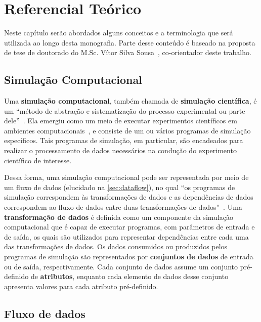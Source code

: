 
\chapter{Referencial Teórico}%
\label{chap:referencial-teorico}

Neste capítulo serão abordados alguns conceitos e a terminologia que será utilizada ao longo desta monografia. Parte desse conteúdo é baseado na proposta de tese de doutorado do M.Sc. Vítor Silva Sousa~\cite{silva2015propostadoutorado}, co-orientador deste trabalho.

\section{Simulação Computacional}

Uma \textbf{simulação computacional}, também chamada de \textbf{simulação científica}, é um ``método de abstração e sistematização do processo experimental ou parte dele''~\cite{silva2015propostadoutorado,dias2015data}. Ela emergiu como um meio de executar experimentos científicos em ambientes computacionais~\cite{ogasawara2011algebraic}, e consiste de um ou vários programas de simulação específicos. Tais programas de simulação, em particular, são encadeados para realizar o processamento de dados necessários na condução do experimento científico de interesse.

Dessa forma, uma simulação computacional pode ser representada por meio de um fluxo de dados (elucidado na \autoref{sec:dataflow}), no qual ``os programas de simulação correspondem às transformações de dados e as dependências de dados correspondem ao fluxo de dados entre duas transformações de dados''~\cite{silva2015propostadoutorado,ogasawara2011algebraic}. Uma \textbf{transformação de dados} é definida como um componente da simulação computacional que é capaz de executar programas, com parâmetros de entrada e de saída, os quais são utilizados para representar dependências entre cada uma das transformações de dados. Os dados consumidos ou produzidos pelos programas de simulação são representados por \textbf{conjuntos de dados} de entrada ou de saída, respectivamente. Cada conjunto de dados assume um conjunto pré-definido de \textbf{atributos}, enquanto cada elemento de dados desse conjunto apresenta valores para cada atributo pré-definido.

\section{Fluxo de dados}%
\label{sec:dataflow}

